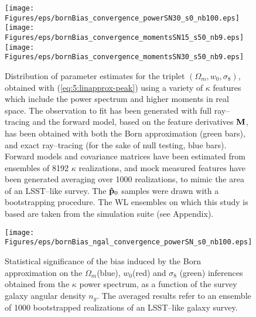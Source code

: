 % 
\begin{figure}
\begin{center}
\texttt{[image: Figures/eps/bornBias\_convergence\_powerSN30\_s0\_nb100.eps]}
\texttt{[image: Figures/eps/bornBias\_convergence\_momentsSN15\_s50\_nb9.eps]}
\texttt{[image: Figures/eps/bornBias\_convergence\_momentsSN30\_s50\_nb9.eps]}
\end{center}
\caption{Distribution of parameter estimates for the triplet $(\Omega_m,w_0,\sigma_8)$, obtained with (\ref{eq:5:linapprox-peak}) using a variety of $\kappa$ features which include the power spectrum and higher moments in real space. The observation to fit has been generated with full ray--tracing and the forward model, based on the feature derivatives $\mathbf{M}$, has been obtained with both the Born approximation (green bars), and exact ray--tracing (for the sake of null testing, blue bars). Forward models and covariance matrices have been estimated from ensembles of 8192 $\kappa$ realizations, and  mock measured features have been generated averaging over 1000 realizations, to mimic the area of an LSST--like survey. The $\mathbf{\hat{p}}_0$ samples were drawn with a bootstrapping procedure. The WL ensembles on which this study is based are taken from the  simulation suite (see Appendix).}
\label{fig:7:biasfeat}
\end{figure}
%
\begin{figure}
\begin{center}
\texttt{[image: Figures/eps/bornBias\_ngal\_convergence\_powerSN\_s0\_nb100.eps]}
\end{center}
\caption{Statistical significance of the bias induced by the Born approximation on the $\Omega_m$(blue), $w_0$(red) and  $\sigma_8$ (green) inferences obtained from the $\kappa$ power spectrum, as a function of the survey galaxy angular density $n_g$. The averaged results refer to an ensemble of 1000 bootstrapped realizations of an LSST--like galaxy survey.}
\label{fig:7:biasbornngal}
\end{figure}
%
